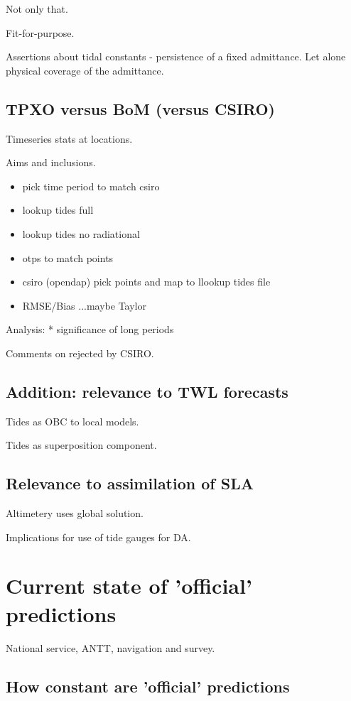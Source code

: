 Not only that.

Fit-for-purpose.

Assertions about tidal constants - persistence of a fixed admittance.   Let alone physical coverage of the admittance.


\subsection{TPXO versus BoM (versus CSIRO)}
Timeseries stats at locations.

Aims and inclusions.
\begin{itemize}
    \item pick time period to match csiro
    \item lookup tides full
    \item lookup tides no radiational
    \item otps to match points
    \item csiro (opendap) pick points and map to llookup tides file
    \item RMSE/Bias ...maybe Taylor
\end{itemize}

Analysis:
* significance of long periods

Comments on rejected by CSIRO.

\subsection{Addition: relevance to TWL forecasts}
Tides as OBC to local models.

Tides as superposition component.

\subsection{Relevance to assimilation of SLA}
Altimetery uses global solution.

Implications for use of tide gauges for DA.


\section{Current state of 'official' predictions}

National service, ANTT, navigation and survey.

\subsection{How constant are 'official' predictions}

